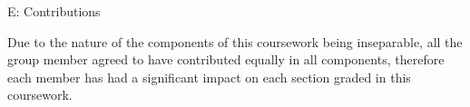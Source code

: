 \documentclass[conference]{IEEEtran}
\begin{document}
\noindent
E: Contributions
\\
\par
\noindent
Due to the nature of the components of this coursework being inseparable, all the group member agreed to have contributed equally in all components, therefore each member has had a significant impact on each section graded in this coursework. 
\end{document}
